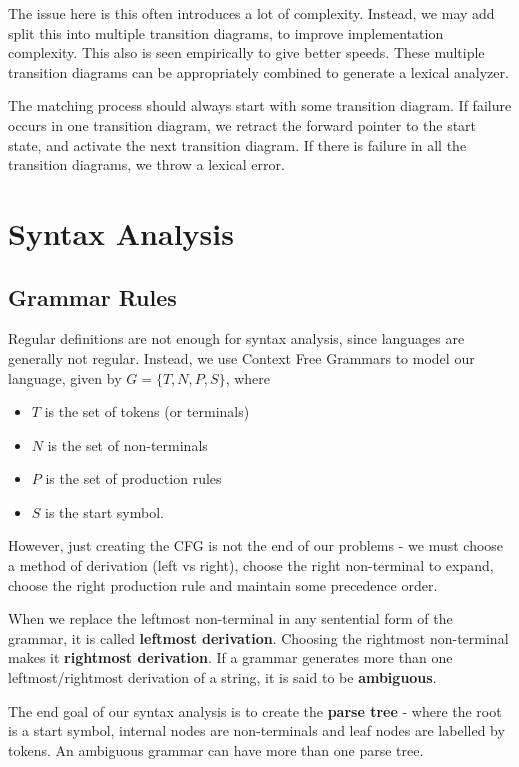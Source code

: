 \documentclass[12pt,letterpaper]{book}
\theoremstyle{definition}
\begin{document}
The issue here is this often introduces a lot of complexity. Instead, we may add split this into multiple transition diagrams, to improve implementation complexity. This also is seen empirically to give better speeds. These multiple transition diagrams can be appropriately combined to generate a lexical analyzer.

The matching process should always start with some transition diagram. If failure occurs in one transition diagram, we retract the forward pointer to the start state, and activate the next transition diagram. If there is failure in all the transition diagrams, we throw a lexical error.

\chapter{Syntax Analysis}

\section{Grammar Rules}

Regular definitions are not enough for syntax analysis, since languages are generally not regular. Instead, we use Context Free Grammars to model our language, given by $G = \{T,N,P,S\}$, where

\begin{itemize}
  \item $T$ is the set of tokens (or terminals)
  \item $N$ is the set of non-terminals
  \item $P$ is the set of production rules
  \item $S$ is the start symbol.
\end{itemize}

However, just creating the CFG is not the end of our problems - we must choose a method of derivation (left vs right), choose the right non-terminal to expand, choose the right production rule and maintain some precedence order.

When we replace the leftmost non-terminal in any sentential form of the grammar, it is called \textbf{leftmost derivation}. Choosing the rightmost non-terminal makes it \textbf{rightmost derivation}. If a grammar generates more than one leftmost/rightmost derivation of a string, it is said to be \textbf{ambiguous}.

The end goal of our syntax analysis is to create the \textbf{parse tree} - where the root is a start symbol, internal nodes are non-terminals and leaf nodes are labelled by tokens. An ambiguous grammar can have more than one parse tree.
\end{document}
